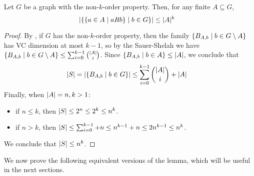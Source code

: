     \begin{lemma}[Claim 2.6] \label{lem:k_order_propery_bounds_BAbs}
        Let $G$ be a graph with the non-$k$-order property.
        Then, for any finite $A \subseteq G$,
        \[
            \left| \left\{ \left\{ a \in A \mid a R b \right\} \mid b \in G \right\} \right| \leq |A|^k
        \]
        \begin{proof}
            By , if $G$ has the non-$k$-order property,
            then the family $\left\{ B_{A,b} \mid b \in G \setminus A \right\}$ has VC dimension at most $k-1$,
            so by the Sauer-Shelah  we have
            $\left\{ B_{A,b} \mid b \in G \setminus A \right\} \leq \sum_{i=0}^{k-1} \binom{|A|}{i}$.
            Since $\left\{ B_{A,b} \mid b \in A \right\} \leq \left| A \right|$, we conclude that
            \[
                \left| S \right| = \left| \left\{ B_{A,b} \mid b \in G \right\} \right| \leq \sum_{i=0}^{k-1} \binom{|A|}{i} + |A|
            \]
            Finally, when $\left| A \right| = n,k > 1$: 
            \begin{itemize}
                \item if $n \leq k$, then $\left| S \right| \leq 2^n \leq 2^k \leq n^k$.
                \item if $n > k$, then $\left| S \right| \leq \sum_{i=0}^{k-1} + n \leq n^{k-1} + n \leq 2n^{k-1} \leq n^k$.
            \end{itemize}
            We conclude that $\left| S \right| \leq n^k$.
        \end{proof}
    \end{lemma}

    We now prove the following equivalent versions of the lemma, which will be useful in the next sections.

